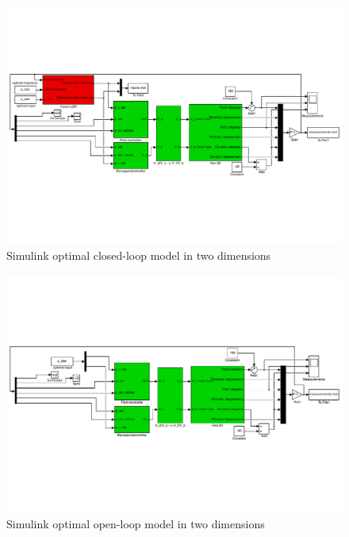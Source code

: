 \begin{figure}[htb]
	\centering
 	\includegraphics[width = \textwidth]{figures/day4_cl/day4_cl_mdl}
 	\caption{Simulink optimal closed-loop model in two dimensions}
 	\label{fig:simulink_day4_cl}
\end{figure}

\begin{figure}[htb]
	\centering
 	\includegraphics[width = \textwidth]{figures/day4_ol/day4_ol_mdl}
 	\caption{Simulink optimal open-loop model in two dimensions}
 	\label{fig:simulink_day4_ol}
\end{figure}

